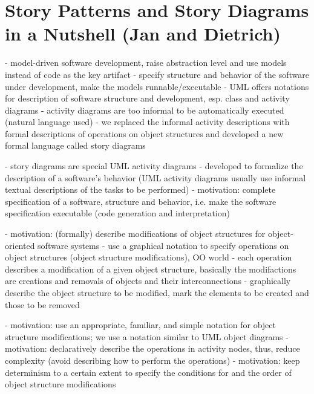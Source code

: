 \section{Story Patterns and Story Diagrams in a Nutshell (Jan and Dietrich)} \label{sec:Overview}

- model-driven software development, raise abstraction level and use models instead of code as the key artifact
- specify structure and behavior of the software under development, make the models runnable/executable
- UML offers notations for description of software structure and development, esp. class and activity diagrams
- activity diagrams are too informal to be automatically executed (natural language used)
- we replaced the informal activity descriptions with formal descriptions of operations on object structures and developed a new formal language called story diagrams

- story diagrams are special UML activity diagrams
- developed to formalize the description of a software's behavior (UML activity diagrams usually use informal textual descriptions of the tasks to be performed)
- motivation: complete specification of a software, structure and behavior, i.e. make the software specification executable (code generation and interpretation)

- motivation: (formally) describe modifications of object structures for object-oriented software systems
- use a graphical notation to specify operations on object structures (object structure modifications), OO world
- each operation describes a modification of a given object structure, basically the modifactions are creations and removals of objects and their interconnections
- graphically describe the object structure to be modified, mark the elements to be created and those to be removed


- motivation: use an appropriate, familiar, and simple notation for object structure modifications; we use a notation similar to UML object diagrams
- motivation: declaratively describe the operations in activity nodes, thus, reduce complexity (avoid describing how to perform the operations)
- motivation: keep determinism to a certain extent to specify the conditions for and the order of object structure modifications

